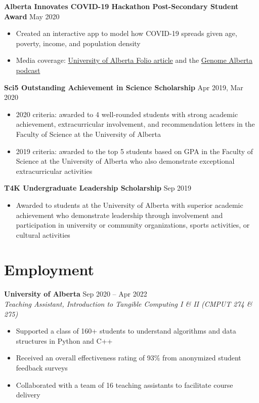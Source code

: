 \documentclass{article}
\begin{document}
\textbf{Alberta Innovates COVID-19 Hackathon Post-Secondary Student Award} \hfill May 2020
\begin{itemize}
    \item Created an interactive app to model how COVID-19 spreads given age, poverty, income, and population density
    \item Media coverage: \href{https://www.folio.ca/students-develop-online-tool-to-predict-covid-19-spread-based-on-demographics/}{University of Alberta Folio article} and the \href{https://genomealberta.ca/genomics/genomics_blog_08182001.aspx}{Genome Alberta podcast}
\end{itemize} \vspace{1em}

\textbf{Sci5 Outstanding Achievement in Science Scholarship} \hfill Apr 2019, Mar 2020
\begin{itemize}
    \item 2020 criteria: awarded to 4 well-rounded students with strong academic achievement, extracurricular involvement, and recommendation letters in the Faculty of Science at the University of Alberta
    \item 2019 criteria: awarded to the top 5 students based on GPA in the Faculty of Science at the University of Alberta who also demonstrate exceptional extracurricular activities
\end{itemize} \vspace{1em}

\textbf{T4K Undergraduate Leadership Scholarship} \hfill Sep 2019
\begin{itemize}
    \item Awarded to students at the University of Alberta with superior academic achievement who demonstrate leadership through involvement and participation in university or community organizations, sports activities, or cultural activities
\end{itemize}


\section*{\textcolor{my_colour}{Employment}}
\vspace{-.25em} \hrulefill \vspace{.25em}

\textbf{University of Alberta} \hfill Sep 2020 -- Apr 2022 \\
\textit{Teaching Assistant, Introduction to Tangible Computing I \& II (CMPUT 274 \& 275)}
\begin{itemize}
    \item Supported a class of 160+ students to understand algorithms and data structures in Python and C++
    \item Received an overall effectiveness rating of 93\% from anonymized student feedback surveys
    \item Collaborated with a team of 16 teaching assistants to facilitate course delivery
\end{itemize} \vspace{1em}
\end{document}
